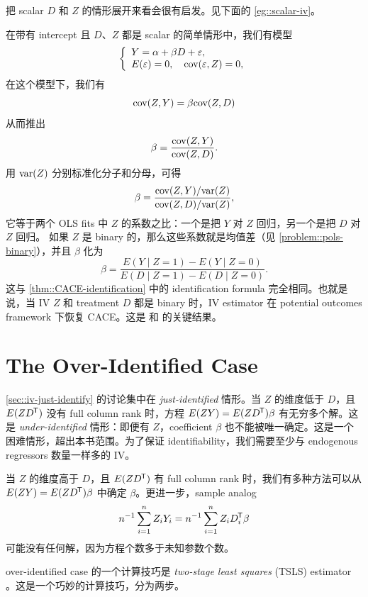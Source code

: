把 scalar $D$ 和 $Z$ 的情形展开来看会很有启发。见下面的 \cref{eg::scalar-iv}。

\begin{example}\label{eg::scalar-iv}
在带有 intercept 且 $D$、$Z$ 都是 scalar 的简单情形中，我们有模型
$$
\left\{ \begin{array}{l}
Y = \alpha +  \beta  D + \varepsilon ,\\
E(\varepsilon) = 0, \quad \textup{cov}(\varepsilon, Z) = 0,
\end{array}
\right.
$$
在这个模型下，我们有
$$
\textup{cov}( Z, Y ) = \beta \textup{cov}(Z, D) 
$$
从而推出
$$
 \beta = \frac{ \textup{cov}( Z, Y )   }{ \textup{cov}(Z, D) }.
$$
用 $\textup{var}(Z)$ 分别标准化分子和分母，可得
$$
\beta =  \frac{ \textup{cov}( Z, Y ) / \textup{var}(Z)  }{ \textup{cov}(Z, D) / \textup{var}(Z) },
$$
它等于两个 OLS fits 中 $Z$ 的系数之比：一个是把 $Y$ 对 $Z$ 回归，另一个是把 $D$ 对 $Z$ 回归。
如果 $Z$ 是 binary 的，那么这些系数就是均值差（见 \cref{problem::pols-binary}），并且 $\beta$ 化为
$$
\beta = \frac{ E(Y\mid Z=1) - E(Y\mid Z=0)  }{ E(D\mid Z=1) - E(D\mid Z=0) } .
$$
这与 \cref{thm::CACE-identification} 中的 identification formula 完全相同。也就是说，当 IV $Z$ 和 treatment $D$ 都是 binary 时，IV estimator 在 potential outcomes framework 下恢复 CACE。这是 \citet{imbens1994identification} 和 \citet{angrist1996identification} 的关键结果。  
\end{example}



 

\section{The Over-Identified Case}
\label{sec::sec::iv-over-identify}

\cref{sec::iv-just-identify} 的讨论集中在 {\it just-identified} 情形。当 $Z$ 的维度低于 $D$，且 $E(ZD^{\mkern-1.5mu\mathsf{T}})$ 没有 full column rank 时，方程 $E(  ZY)  = E(ZD^{\mkern-1.5mu\mathsf{T}}) \beta$ 有无穷多个解。这是 {\it under-identified} 情形：即便有 $Z$，coefficient $\beta$ 也不能被唯一确定。这是一个困难情形，超出本书范围。为了保证 identifiability，我们需要至少与 endogenous regressors 数量一样多的 IV。 

当 $Z$ 的维度高于 $D$，且 $E(ZD^{\mkern-1.5mu\mathsf{T}})$ 有 full column rank 时，我们有多种方法可以从 $E(  ZY)  = E(ZD^{\mkern-1.5mu\mathsf{T}}) \beta$ 中确定 $\beta$。更进一步，sample analog
$$
n^{-1} \sum_{i=1}^n Z_iY_i = n^{-1} \sum_{i=1}^n Z_i D_i^{\mkern-1.5mu\mathsf{T}} \beta
$$
可能没有任何解，因为方程个数多于未知参数个数。 


over-identified case 的一个计算技巧是 {\it two-stage least squares} (TSLS) estimator \citep{theil1953estimation, basmann1957generalized}。这是一个巧妙的计算技巧，分为两步。

